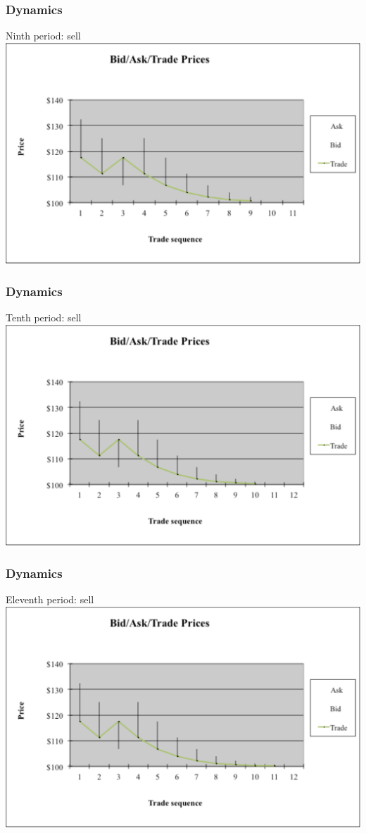 \documentclass[english,10pt]{beamer}
\begin{document}
\begin{frame} [noframenumbering]
	\frametitle{Dynamics}
	Ninth period: sell
	\center
	\includegraphics[width=0.9\linewidth]{pics/P9_Image.pdf}
\end{frame}


\begin{frame} [noframenumbering]
	\frametitle{Dynamics}
	Tenth period: sell
	\center
	\includegraphics[width=0.9\linewidth]{pics/P10_Image.pdf}
\end{frame}


\begin{frame} [noframenumbering]
	\frametitle{Dynamics}
	Eleventh period: sell
	\center
	\includegraphics[width=0.9\linewidth]{pics/P11_Image.pdf}
\end{frame}
\end{document}
